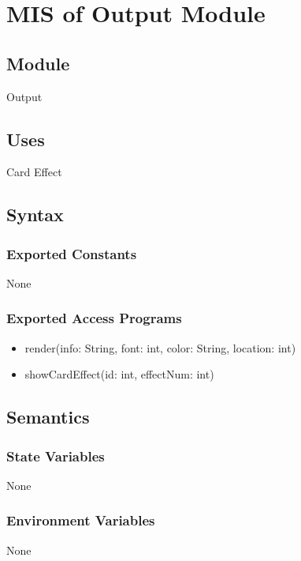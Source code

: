 \documentclass[12pt, titlepage]{article}
\begin{document}
\section{MIS of Output Module} 
\label{OM}

\subsection{Module}
\hspace{1.5em}Output

\subsection{Uses}
\hspace{1.5em}Card Effect

\subsection{Syntax}

\subsubsection{Exported Constants}
\hspace{1.5em}None

\subsubsection{Exported Access Programs}

\begin{itemize}
\item render(info: String, font: int, color: String, location: int)
\item showCardEffect(id: int, effectNum: int)
\end{itemize}

\subsection{Semantics}

\subsubsection{State Variables}
\hspace{1.5em}None

\subsubsection{Environment Variables}
\hspace{1.5em}None
\end{document}
